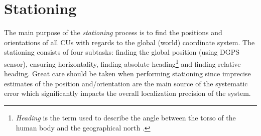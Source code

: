 %
%	
%
%


\vata[20]

\section{Stationing} \label{txt:stationing}

The main purpose of the \textit{stationing} process is to find the positions and orientations of all CUs with regards to the global (world) coordinate system. The stationing consists of four subtasks: finding the global position (using DGPS sensor), ensuring horizontality, finding absolute heading\footnote{\textit{Heading} is the term used to describe the angle between the torso of the human body and the geographical north \cite{Henriksson648760}.} and finding relative heading. Great care should be taken when performing stationing since imprecise estimates of the position and/orientation are the main source of the systematic error which significantly impacts the overall localization precision of the system.

